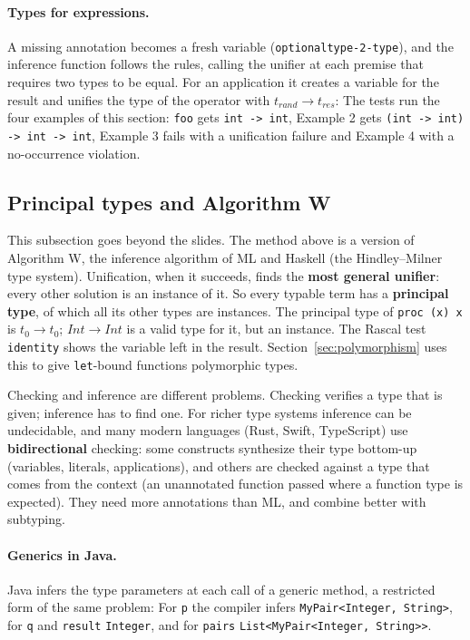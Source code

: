\paragraph{Types for expressions.} A missing annotation becomes a fresh
variable (\texttt{optionaltype-2-type}), and the inference function follows
the rules, calling the unifier at each premise that requires two types to be
equal. For an application it creates a variable for the result and unifies
the type of the operator with $t_{\mathit{rand}} \to t_{\mathit{res}}$:
The tests run the four examples of this section: \texttt{foo} gets
\texttt{int -> int}, Example 2 gets \texttt{(int -> int) -> int -> int}, Example 3
fails with a unification failure and Example 4 with a no-occurrence violation.

\subsection{Principal types and Algorithm W}

This subsection goes beyond the slides. The method above is a version of
Algorithm W, the inference algorithm of ML and Haskell (the Hindley--Milner
type system). Unification, when it succeeds, finds the \textbf{most general
unifier}: every other solution is an instance of it. So every typable term
has a \textbf{principal type}, of which all its other types are instances.
The principal type of \texttt{proc (x) x} is $t_0 \to t_0$; $\mathit{Int} \to \mathit{Int}$
is a valid type for it, but an instance. The Rascal test \texttt{identity}
shows the variable left in the result. Section~\ref{sec:polymorphism} uses this
to give \texttt{let}-bound functions polymorphic types.

Checking and inference are different problems. Checking verifies a type that
is given; inference has to find one. For richer type systems inference can
be undecidable, and many modern languages (Rust, Swift, TypeScript) use
\textbf{bidirectional} checking: some constructs synthesize their type
bottom-up (variables, literals, applications), and others are checked against
a type that comes from the context (an unannotated function passed where a
function type is expected). They need more annotations than ML, and combine
better with subtyping.

\paragraph{Generics in Java.} Java infers the type parameters at each call of a
generic method, a restricted form of the same problem:
For \texttt{p} the compiler infers \texttt{MyPair<Integer, String>}, for
\texttt{q} and \texttt{result} \texttt{Integer}, and for \texttt{pairs}
\texttt{List<MyPair<Integer, String>>}.

